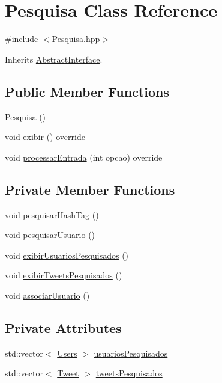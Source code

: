 \hypertarget{class_pesquisa}{}\section{Pesquisa Class Reference}
\label{class_pesquisa}


{\ttfamily \#include $<$Pesquisa.\+hpp$>$}



Inherits \hyperlink{class_abstract_interface}{Abstract\+Interface}.

\subsection*{Public Member Functions}
\begin{DoxyCompactItemize}
\item 
\hyperlink{class_pesquisa_a010148be71942e2cdc94bc0ace0c911c}{Pesquisa} ()
\item 
void \hyperlink{class_pesquisa_a6184f213f4535f9c39900e6f41f05277}{exibir} () override
\item 
void \hyperlink{class_pesquisa_a15652da6caa4d4f41c86dc966168a789}{processar\+Entrada} (int opcao) override
\end{DoxyCompactItemize}
\subsection*{Private Member Functions}
\begin{DoxyCompactItemize}
\item 
void \hyperlink{class_pesquisa_a5d31daf2e13d7d4798409f1c5fe15066}{pesquisar\+Hash\+Tag} ()
\item 
void \hyperlink{class_pesquisa_a1ba3394f5574ef910c069f9fb9595822}{pesquisar\+Usuario} ()
\item 
void \hyperlink{class_pesquisa_a8baacaa888e287c3c681323d9ebe5c18}{exibir\+Usuarios\+Pesquisados} ()
\item 
void \hyperlink{class_pesquisa_aff21347ac401cdb4a2dcdafff8c6f98e}{exibir\+Tweets\+Pesquisados} ()
\item 
void \hyperlink{class_pesquisa_afef000de3cde966df1e84cec1c95ca4d}{associar\+Usuario} ()
\end{DoxyCompactItemize}
\subsection*{Private Attributes}
\begin{DoxyCompactItemize}
\item 
std\+::vector$<$ \hyperlink{class_users}{Users} $>$ \hyperlink{class_pesquisa_a4abad4d5020c7ccb625d657d45675821}{usuarios\+Pesquisados}
\item 
std\+::vector$<$ \hyperlink{class_tweet}{Tweet} $>$ \hyperlink{class_pesquisa_a96f7efb3800aa029e233bea96b323b76}{tweets\+Pesquisados}
\end{DoxyCompactItemize}


